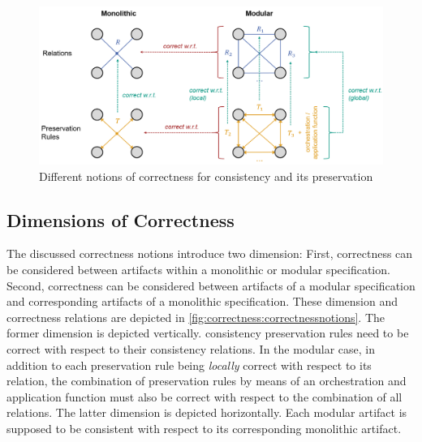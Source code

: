 \begin{figure}
    \centering
    \includegraphics[width=\textwidth]{figures/correctness/formal/correctness_notions.png}
    \caption[Notions of correctness for consistency and its preservation]{Different notions of correctness for consistency and its preservation}
    \label{fig:correctness:correctnessnotions}
\end{figure}


\subsection{Dimensions of Correctness}
\label{chap:correctness:notions:dimensions}

The discussed correctness notions introduce two dimension: First, correctness can be considered between artifacts within a monolithic or modular specification. Second, correctness can be considered between artifacts of a modular specification and corresponding artifacts of a monolithic specification. These dimension and correctness relations are depicted in \autoref{fig:correctness:correctnessnotions}.
The former dimension is depicted vertically. \Glspl{consistency preservation rule} need to be correct with respect to their \glspl{consistency relation}.
In the modular case, in addition to each preservation rule being \emph{locally} correct with respect to its relation, the combination of preservation rules by means of an orchestration and application function must also be correct with respect to the combination of all relations.
The latter dimension is depicted horizontally. Each modular artifact is supposed to be consistent with respect to its corresponding monolithic artifact.


